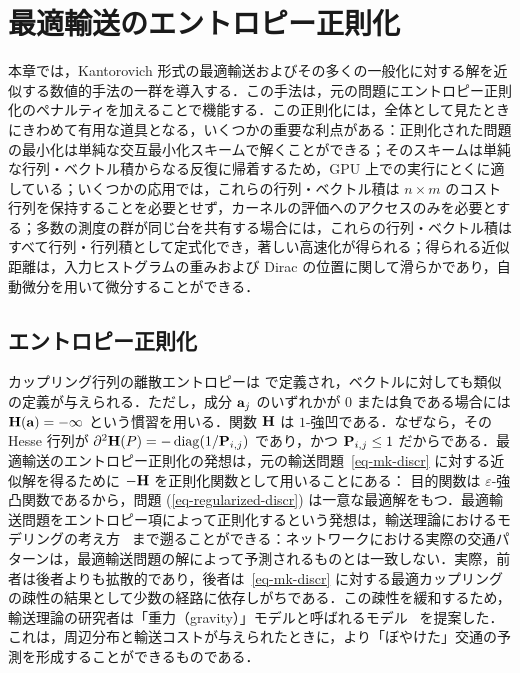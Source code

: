 
\chapter{最適輸送のエントロピー正則化}
\label{c-entropic}

本章では，Kantorovich 形式の最適輸送およびその多くの一般化に対する解を近似する数値的手法の一群を導入する．この手法は，元の問題にエントロピー正則化のペナルティを加えることで機能する．この正則化には，全体として見たときにきわめて有用な道具となる，いくつかの重要な利点がある：正則化された問題の最小化は単純な交互最小化スキームで解くことができる；そのスキームは単純な行列・ベクトル積からなる反復に帰着するため，GPU 上での実行にとくに適している；いくつかの応用では，これらの行列・ベクトル積は $n\times m$ のコスト行列を保持することを必要とせず，カーネルの評価へのアクセスのみを必要とする；多数の測度の群が同じ台を共有する場合には，これらの行列・ベクトル積はすべて行列・行列積として定式化でき，著しい高速化が得られる；得られる近似距離は，入力ヒストグラムの重みおよび Dirac の位置に関して滑らかであり，自動微分を用いて微分することができる．

\section{エントロピー正則化}

カップリング行列の離散エントロピーは
で定義され，ベクトルに対しても類似の定義が与えられる．ただし，成分 $\a_j$ のいずれかが $0$ または負である場合には $\HD(\a) = -\infty$ という慣習を用いる．関数 $\HD$ は $1$-強凹である．なぜなら，その Hesse 行列が $\partial^2 \HD(P)=-\diag(1/\P_{i,j})$ であり，かつ $\P_{i,j} \leq 1$ だからである．最適輸送のエントロピー正則化の発想は，元の輸送問題~\eqref{eq-mk-discr} に対する近似解を得るために $-\HD$ を正則化関数として用いることにある：
目的関数は $\varepsilon$-強凸関数であるから，問題 (\ref{eq-regularized-discr}) は一意な最適解をもつ．最適輸送問題をエントロピー項によって正則化するという発想は，輸送理論におけるモデリングの考え方~\citep{wilson1969use} まで遡ることができる：ネットワークにおける実際の交通パターンは，最適輸送問題の解によって予測されるものとは一致しない．実際，前者は後者よりも拡散的であり，後者は~\eqref{eq-mk-discr} に対する最適カップリングの疎性の結果として少数の経路に依存しがちである．この疎性を緩和するため，輸送理論の研究者は「重力（gravity）」モデルと呼ばれるモデル~\citep{erlander1980optimal} を提案した．これは，周辺分布と輸送コストが与えられたときに，より「ぼやけた」交通の予測を形成することができるものである．

